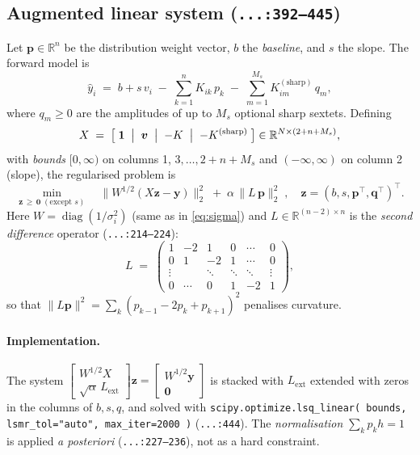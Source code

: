 \documentclass[11pt,a4paper]{article}
\newcommand{\code}[1]{\texttt{\small #1}}
\newcommand{\file}[1]{\textcolor{black!70}{\texttt{\small #1}}}
\DeclareMathOperator{\diag}{diag}
\begin{document}
\subsection{Augmented linear system (\file{...:392--445})}
Let $\bm p\in\mathbb R^{n}$ be the distribution weight vector, $b$ the \emph{baseline}, and $s$ the slope. The forward model is
\begin{equation}
  \hat y_i \;=\; b + s\,v_i \;-\; \sum_{k=1}^{n} K_{ik}\,p_k \;-\; \sum_{m=1}^{M_s} K^{(\text{sharp})}_{im}\,q_m,
  \label{eq:fwd_dist}
\end{equation}
where $q_m\ge 0$ are the amplitudes of up to $M_s$ optional sharp sextets. Defining
\[
  X \;=\;
  \bigl[\;\bm 1\;\bigm|\;\bm v\;\bigm|\;{-}K\;\bigm|\;{-}K^{(\text{sharp})}\;\bigr]\in\mathbb R^{N\times(2+n+M_s)},
\]
with \emph{bounds} $[0,\infty)$ on columns 1, $3,\dots,2+n+M_s$ and $(-\infty,\infty)$ on column 2 (slope), the regularised problem is
\begin{equation}
  \boxed{\;
  \min_{\bm z\,\ge\,\bm 0\;(\text{except }s)}\quad
  \bigl\|W^{1/2}(X\bm z - \bm y)\bigr\|_{2}^{2}
  \;+\;\alpha\,\bigl\|L\,\bm p\bigr\|_{2}^{2}\;,
  \quad \bm z=(b,s,\bm p^\top,\bm q^\top)^\top.
  \;}
  \label{eq:tikh}
\end{equation}
Here $W=\diag(1/\sigma_i^{2})$ (same as in \eqref{eq:sigma}) and $L\in\mathbb R^{(n-2)\times n}$ is the \emph{second difference} operator (\file{...:214--224}):
\begin{equation}
  L \;=\;
  \begin{pmatrix}
    1 & -2 & 1 & 0 & \cdots & 0\\
    0 & 1 & -2 & 1 & \cdots & 0\\
    \vdots & & \ddots & \ddots & \ddots & \vdots\\
    0 & \cdots & 0 & 1 & -2 & 1
  \end{pmatrix},
\end{equation}
so that $\|L\bm p\|^{2} = \sum_k (p_{k-1}-2p_k+p_{k+1})^{2}$ penalises curvature.

\paragraph{Implementation.} The system $\left[\begin{smallmatrix} W^{1/2}X \\ \sqrt\alpha\,L_{\text{ext}} \end{smallmatrix}\right]\bm z = \left[\begin{smallmatrix}W^{1/2}\bm y\\ \bm 0\end{smallmatrix}\right]$ is stacked with $L_{\text{ext}}$ extended with zeros in the columns of $b,s,q$, and solved with \code{scipy.optimize.lsq\_linear(\,bounds, lsmr\_tol="auto", max\_iter=2000\,)} (\file{...:444}). The \emph{normalisation} $\sum_k p_k h = 1$ is applied \emph{a posteriori} (\file{...:227--236}), not as a hard constraint.
\end{document}
